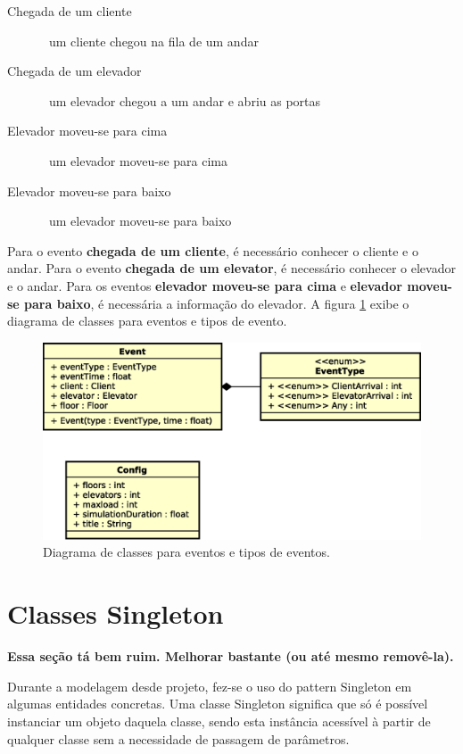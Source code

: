 \begin{description}
  \item[Chegada de um cliente] \hfill \ um cliente chegou na fila de um andar
  \item[Chegada de um elevador] \hfill \ um elevador chegou a um andar e abriu as portas
  \item[Elevador moveu-se para cima] \hfill \ um elevador moveu-se para cima
  \item[Elevador moveu-se para baixo] \hfill \ um elevador moveu-se para baixo
\end{description}

Para o evento \textbf{chegada de um cliente}, é necessário conhecer o cliente e
o andar. Para o evento \textbf{chegada de um elevator}, é necessário conhecer o
elevador e o andar. Para os eventos \textbf{elevador moveu-se para cima} e
\textbf{elevador moveu-se para baixo}, é necessária a informação do elevador. A
figura \ref{fig:diagram:event} exibe o diagrama de classes para eventos e tipos
de evento.

\begin{figure}[htb!]
  \centering
  \includegraphics[scale=0.6]{img/Basic.eps}
  \caption{Diagrama de classes para eventos e tipos de eventos.}
\label{fig:diagram:event}
\end{figure}

\section{Classes Singleton}

\textbf{Essa seção tá bem ruim. Melhorar bastante (ou até mesmo removê-la).}

Durante a modelagem desde projeto, fez-se o uso do pattern Singleton em algumas
entidades concretas. Uma classe Singleton significa que só é possível instanciar
um objeto daquela classe, sendo esta instância acessível à partir de qualquer
classe sem a necessidade de passagem de parâmetros.

